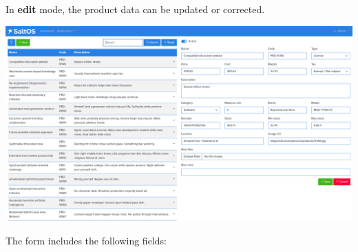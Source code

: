 \documentclass[a4paper]{article}
\begin{document}
In \textbf{edit} mode, the product data can be updated or corrected.

\begin{center}\includegraphics[width=1\textwidth]{../ujest/snaps/test-screenshots-js-screenshots-sales-products-edit-100-en-us-1-snap.png}\end{center}

The form includes the following fields:
\end{document}
